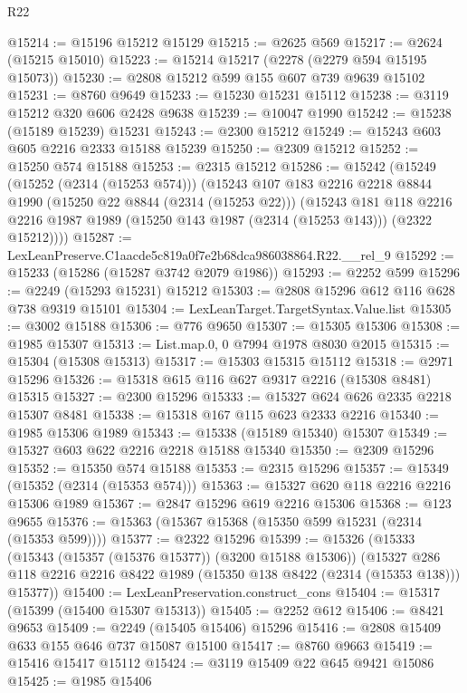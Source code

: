 \begin{lexlean}{R22}
\begin{coremodule}
@15214 := @15196 @15212 @15129
@15215 := @2625 @569
@15217 := @2624 (@15215 @15010)
@15223 := @15214 @15217 (@2278 (@2279 @594 @15195 @15073))
@15230 := @2808 @15212 @599 @155 @607 @739 @9639 @15102
@15231 := @8760 @9649
@15233 := @15230 @15231 @15112
@15238 := @3119 @15212 @320 @606 @2428 @9638
@15239 := @10047 @1990
@15242 := @15238 (@15189 @15239) @15231
@15243 := @2300 @15212
@15249 := @15243 @603 @605 @2216 @2333 @15188 @15239
@15250 := @2309 @15212
@15252 := @15250 @574 @15188
@15253 := @2315 @15212
@15286 := @15242
    (@15249
      (@15252 (@2314 (@15253 @574)))
      (@15243
        @107
        @183
        @2216
        @2218
        @8844
        @1990
        (@15250 @22 @8844 (@2314 (@15253 @22)))
        (@15243
          @181
          @118
          @2216
          @2216
          @1987
          @1989
          (@15250 @143 @1987 (@2314 (@15253 @143)))
          (@2322 @15212))))
@15287 := LexLeanPreserve.C1aacde5c819a0f7e2b68dca986038864.R22.__rel_9
@15292 := @15233 (@15286 (@15287 @3742 @2079 @1986))
@15293 := @2252 @599
@15296 := @2249 (@15293 @15231) @15212
@15303 := @2808 @15296 @612 @116 @628 @738 @9319 @15101
@15304 := LexLeanTarget.TargetSyntax.Value.list
@15305 := @3002 @15188
@15306 := @776 @9650
@15307 := @15305 @15306
@15308 := @1985 @15307
@15313 := List.map.{0, 0} @7994 @1978 @8030 @2015
@15315 := @15304 (@15308 @15313)
@15317 := @15303 @15315 @15112
@15318 := @2971 @15296
@15326 := @15318 @615 @116 @627 @9317 @2216 (@15308 @8481) @15315
@15327 := @2300 @15296
@15333 := @15327 @624 @626 @2335 @2218 @15307 @8481
@15338 := @15318 @167 @115 @623 @2333 @2216
@15340 := @1985 @15306 @1989
@15343 := @15338 (@15189 @15340) @15307
@15349 := @15327 @603 @622 @2216 @2218 @15188 @15340
@15350 := @2309 @15296
@15352 := @15350 @574 @15188
@15353 := @2315 @15296
@15357 := @15349 (@15352 (@2314 (@15353 @574)))
@15363 := @15327 @620 @118 @2216 @2216 @15306 @1989
@15367 := @2847 @15296 @619 @2216 @15306
@15368 := @123 @9655
@15376 := @15363 (@15367 @15368 (@15350 @599 @15231 (@2314 (@15353 @599))))
@15377 := @2322 @15296
@15399 := @15326
    (@15333
      (@15343 (@15357 (@15376 @15377)) (@3200 @15188 @15306))
      (@15327 @286 @118 @2216 @2216 @8422 @1989 (@15350 @138 @8422 (@2314 (@15353 @138))) @15377))
@15400 := LexLeanPreservation.construct_cons
@15404 := @15317 (@15399 (@15400 @15307 @15313))
@15405 := @2252 @612
@15406 := @8421 @9653
@15409 := @2249 (@15405 @15406) @15296
@15416 := @2808 @15409 @633 @155 @646 @737 @15087 @15100
@15417 := @8760 @9663
@15419 := @15416 @15417 @15112
@15424 := @3119 @15409 @22 @645 @9421 @15086
@15425 := @1985 @15406

\end{coremodule}
\end{lexlean}
